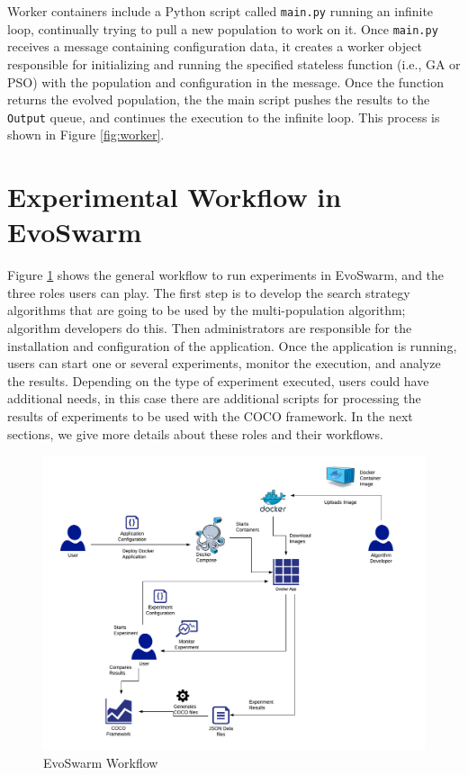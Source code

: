 \documentclass[review]{elsarticle}
\begin{document}
Worker containers include a Python script called \texttt{main.py} running an
infinite loop, continually trying to pull a new population to work on it. Once
\texttt{main.py} receives a message containing configuration data, it creates a
worker object responsible for initializing and running the specified stateless
function (i.e., GA or PSO) with the population and configuration in the message.
Once the function returns the evolved population, the
the main script pushes the results to the \texttt{Output} queue, and continues
the execution to the infinite loop. This process is shown in Figure
\ref{fig:worker}.

\section{Experimental Workflow in EvoSwarm} %
\label{experiment_flow}

Figure \ref{fig:experiment_flow} shows the general workflow to run experiments
in Evo\-Swarm, and the three roles users can play. The first step is to develop the
search strategy algorithms that are going to be used by the multi-population
algorithm; algorithm developers do this. Then administrators are responsible for
the installation and configuration of the application. Once the application is
running, users can start one or several experiments, monitor the execution, and
analyze the results. Depending on the type of experiment executed, users could
have additional needs, in this case there are additional scripts for
processing the results of experiments to be used with the COCO framework. In the
next sections, we give more details about these roles and their workflows.  

\begin{figure}
    \centering
    \includegraphics[width=\textwidth]{experiment_flow}
    \caption{EvoSwarm Workflow}
    \label{fig:experiment_flow}
\end{figure}
\end{document}
